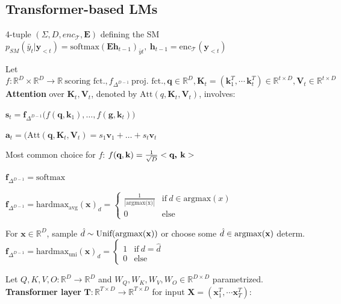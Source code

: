 \subsection{Transformer-based LMs}

 4-tuple \((\Sigma, D, enc_{\mathcal{T}},\mathbf{E})\) defining the SM \(p_{SM}(\bar{y}_t|\mathbf{y}_{<t})=\text{softmax}(\mathbf{Eh}_{t-1})_{\bar{y}t}, \ {\mathbf{h}_{t-1}}=\text{enc}_\mathcal{T}(\mathbf{y}_{<t})\)

 Let \(f:\mathbb{R}^D \times \mathbb{R}^D \to \mathbb{R} \ \text{scoring fct.}, f_{\Delta^{D-1}} \ \text{proj. fct.}, \textbf{q}\in \mathbb{R}^D, \textbf{K}_t = (\textbf{k}_1^T, \cdots\, \textbf{k}_t^T)\in \mathbb{R}^{t\times D}, \textbf{V}_t \in \mathbb{R}^{t\times D}
\) \\
\textbf{Attention} over \(\textbf{K}_t, \textbf{V}_t\), denoted by \(\text{Att}(q, \textbf{K}_t, \textbf{V}_t)\), involves: 

$\textbf{s}_t = \textbf{f}_{\Delta^{D-1}} \big( f(\textbf{q}, \textbf{k}_1), \dots, f(\textbf{g}, \textbf{k}_t) \big) $

$\textbf{a}_t = (\text{Att}(\textbf{q}, \textbf{K}_t, \textbf{V}_t) = s_1 \textbf{v}_1 +  \dots + s_t \textbf{v}_t$

Most common choice for $f$: 
$f(\textbf{q}, \textbf{k}) = \frac{1}{\sqrt{D}}<\textbf{q, \textbf{k}}>$

 \(\textbf{f}_{\Delta^{D-1}} = \text{softmax}\)

 \(\textbf{f}_{\Delta^{D-1}}= \text{hardmax}_{\text{avg}}(\mathbf{x})_d = \begin{cases}
    \frac{1}{|\text{argmax(x)}|} & \text{if} \ d\in \text{argmax}(x) \\
    0 & \text{else}
\end{cases}
\)

 For \(\mathbf{x} \in \mathbb{R}^D\), sample \(\hat{d} \sim \text{Unif(argmax(\textbf{x}))}\) or choose some \(\hat{d} \in \text{argmax(\textbf{x}})\) determ. \(\textbf{f}_{\Delta^{D-1}}= \text{hardmax}_{\text{uni}}(\mathbf{x})_d = \begin{cases}
    1 & \text{if} \ d = \hat{d} \\
    0 & \text{else}
\end{cases}
\)


 Let \(Q, K, V, O: \mathbb{R}^D\to \mathbb{R}^D\) and $W_Q, W_K, W_V, W_O \in \mathbb{R}^{D\times D}$ parametrized. \\
\textbf{Transformer layer} \(\textbf{T}:\mathbb{R}^{T\times D } \to \mathbb{R}^{T\times D }\) for input \(\textbf{X} = (\textbf{x}_1^T, \cdots \textbf{x}_T^T)\): \\

